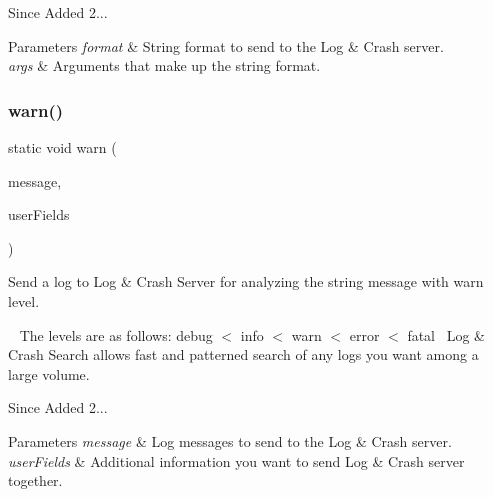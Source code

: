 \begin{DoxySince}{Since}
Added 2... 
\end{DoxySince}

\begin{DoxyParams}{Parameters}
{\em format} & String format to send to the Log \& Crash server. \\
\hline
{\em args} & Arguments that make up the string format. \\
\hline
\end{DoxyParams}
\mbox{\label{classcom_1_1toast_1_1android_1_1gamebase_1_1_gamebase_1_1_logger_a4bfdacb5e58257a0022619f2958c976c}} 
\subsubsection{\texorpdfstring{warn()}{warn()}\hspace{0.1cm}{\footnotesize\ttfamily [3/3]}}
{\footnotesize\ttfamily static void warn (\begin{DoxyParamCaption}\item[{@Non\+Null final String}]{message,  }\item[{@Non\+Null final Map$<$ String, String $>$}]{user\+Fields }\end{DoxyParamCaption})\hspace{0.3cm}{\ttfamily [static]}}



Send a log to Log \& Crash Server for analyzing the string message with warn level. 

~\newline
 The levels are as follows\+: debug $<$ info $<$ warn $<$ error $<$ fatal~\newline
 Log \& Crash Search allows fast and patterned search of any logs you want among a large volume.

\begin{DoxySince}{Since}
Added 2... 
\end{DoxySince}

\begin{DoxyParams}{Parameters}
{\em message} & Log messages to send to the Log \& Crash server. \\
\hline
{\em user\+Fields} & Additional information you want to send Log \& Crash server together. \\
\hline
\end{DoxyParams}
